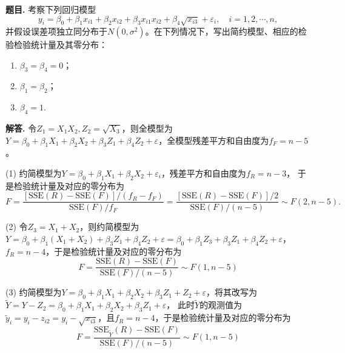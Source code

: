 \documentclass[12pt, a4paper, oneside]{ctexart}
\newcounter{problem}  %
\newenvironment{problem}[1][]{\stepcounter{problem}\par\noindent\textbf{题目\arabic{problem}. #1}}{\smallskip\par}
\newenvironment{solution}[1][]{\par\noindent\textbf{#1解答. }}{\smallskip\par}  %
\def\wtd{\widetilde}        %
\begin{document}
\begin{problem}
    考察下列回归模型
    \begin{equation*}
        y_i = \beta_0+\beta_1x_{i1}+\beta_2x_{i2}+\beta_3x_{i1}x_{i2}+\beta_4\sqrt{x_{i3}}+\varepsilon_i,\quad i=1,2,\cdots,n,
    \end{equation*}
    并假设误差项独立同分布于$N(0,\sigma^2)$。在下列情况下，写出简约模型、相应的检验检验统计量及其零分布：
    \begin{enumerate}[label={(\arabic*)}]
        \item $\beta_3=\beta_4=0$；
        \item $\beta_1=\beta_2$；
        \item $\beta_4 = 1$.
    \end{enumerate}
\end{problem}
\begin{solution}
    令$Z_1= X_1X_2, Z_2 = \sqrt{X_3}$，则全模型为$Y = \beta_0 + \beta_1X_1 + \beta_2X_2 + \beta_3Z_1 + \beta_4Z_2 + \varepsilon$，全模型残差平方和自由度为$f_F = n-5$。

    (1) 约简模型为$Y = \beta_0+\beta_1X_1+\beta_2X_2+\varepsilon_i$，残差平方和自由度为$f_R = n-3$，
    于是检验统计量及对应的零分布为
    \begin{equation*}
        F = \frac{[\text{SSE}(R) - \text{SSE}(F)]/(f_R-f_F)}{\text{SSE}(F)/f_F} = \frac{[\text{SSE}(R)-\text{SSE}(F)]/2}{\text{SSE}(F)/(n-5)}\sim F(2,n-5).
    \end{equation*}

    (2) 令$Z_3 = X_1+X_2$，则约简模型为$Y = \beta_0 + \beta_1(X_1+X_2) + \beta_3Z_1 + \beta_4Z_2+\varepsilon = \beta_0 + \beta_1Z_3 + \beta_3Z_1 + \beta_4Z_2 + \varepsilon$，
    $f_R = n-4$，于是检验统计量及对应的零分布为
    \begin{equation*}
        F = \frac{\text{SSE}(R) - \text{SSE}(F)}{\text{SSE}(F) / (n-5)} \sim F(1,n-5)
    \end{equation*}

    (3) 约简模型为$Y = \beta_0 + \beta_1X_1+\beta_2X_2+\beta_3Z_1 + Z_2 + \varepsilon$，将其改写为$\wtd{Y} = Y - Z_2 = \beta_0 + \beta_1X_1+\beta_2X_2+\beta_3Z_1 + \varepsilon$，
    此时$\wtd{Y}$的观测值为$\tilde{y}_i = y_i-z_{i2} = y_i - \sqrt{x_{i3}}$，且$f_R = n-4$，于是检验统计量及对应的零分布为
    \begin{equation*}
        F = \frac{\text{SSE}_{\wtd{Y}}(R) - \text{SSE}(F)}{\text{SSE}(F) / (n-5)} \sim F(1,n-5)
    \end{equation*}
\end{solution}
\end{document}
